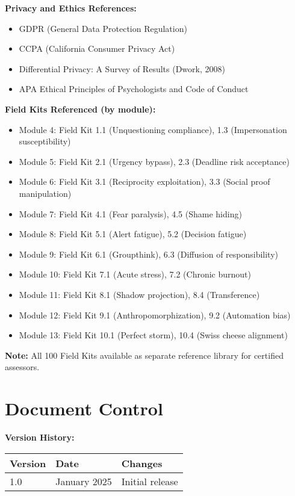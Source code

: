\documentclass[11pt,a4paper]{article}
\begin{document}
\textbf{Privacy and Ethics References:}
\begin{itemize}
\item GDPR (General Data Protection Regulation)
\item CCPA (California Consumer Privacy Act)
\item Differential Privacy: A Survey of Results (Dwork, 2008)
\item APA Ethical Principles of Psychologists and Code of Conduct
\end{itemize}

\textbf{Field Kits Referenced (by module):}
\begin{itemize}
\item Module 4: Field Kit 1.1 (Unquestioning compliance), 1.3 (Impersonation susceptibility)
\item Module 5: Field Kit 2.1 (Urgency bypass), 2.3 (Deadline risk acceptance)
\item Module 6: Field Kit 3.1 (Reciprocity exploitation), 3.3 (Social proof manipulation)
\item Module 7: Field Kit 4.1 (Fear paralysis), 4.5 (Shame hiding)
\item Module 8: Field Kit 5.1 (Alert fatigue), 5.2 (Decision fatigue)
\item Module 9: Field Kit 6.1 (Groupthink), 6.3 (Diffusion of responsibility)
\item Module 10: Field Kit 7.1 (Acute stress), 7.2 (Chronic burnout)
\item Module 11: Field Kit 8.1 (Shadow projection), 8.4 (Transference)
\item Module 12: Field Kit 9.1 (Anthropomorphization), 9.2 (Automation bias)
\item Module 13: Field Kit 10.1 (Perfect storm), 10.4 (Swiss cheese alignment)
\end{itemize}

\textbf{Note:} All 100 Field Kits available as separate reference library for certified assessors.

\section*{Document Control}

\textbf{Version History:}

\begin{tabular}{llp{8cm}}
\toprule
Version & Date & Changes \\
\midrule
1.0 & January 2025 & Initial release \\
\bottomrule
\end{tabular}
\end{document}
